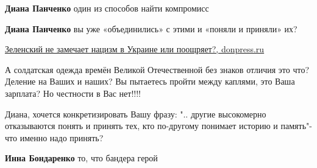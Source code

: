 \begin{itemize}
\begin{itemize}
 
\textbf{Диана Панченко} один из способов найти компромисс

 
\textbf{Диана Панченко} вы уже «объединились» с этими и «поняли и приняли» их?

\href{https://donpress.ru/zelenskij-ne-zamechaet-nacizm-v-ukraine-ili-pooshhrjaet/}{%
Зеленский не замечает нацизм в Украине или поощряет?, donpress.ru
%
}

 

А солдатская одежда времён Великой Отечественной без знаков отличия это что?
Деление на Ваших и наших? Вы пытаетесь пройти между каплями, это Ваша зарплата?
Но честности в Вас нет!!!!

\end{itemize}

 

Диана, хочется конкретизировать Вашу фразу: ".. другие высокомерно отказываются
понять и принять тех, кто по-другому понимает историю и память"- что именно
надо принять?

\begin{itemize}
 
\textbf{Инна Бондаренко} то, что бандера герой


\end{itemize}
\end{itemize}
